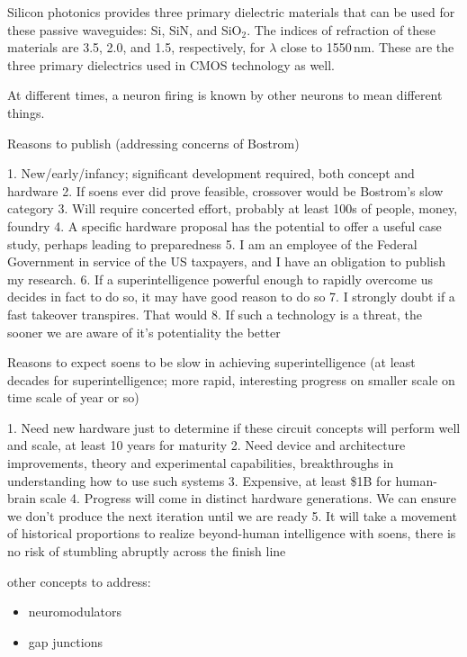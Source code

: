 \documentclass[twocolumn]{article}
\begin{document}
\vspace{2em}
Silicon photonics provides three primary dielectric materials that can be used for these passive waveguides: Si, SiN, and SiO$_2$. The indices of refraction of these materials are 3.5, 2.0, and 1.5, respectively, for $\lambda$ close to 1550\,nm. These are the three primary dielectrics used in CMOS technology as well. 

\vspace{2em}
At different times, a neuron firing is known by other neurons to mean different things.

\vspace{3em}
Reasons to publish (addressing concerns of Bostrom)

1. New/early/infancy; significant development required, both concept and hardware
2. If soens ever did prove feasible, crossover would be Bostrom's slow category
3. Will require concerted effort, probably at least 100s of people, money, foundry
4. A specific hardware proposal has the potential to offer a useful case study, perhaps leading to preparedness
5. I am an employee of the Federal Government in service of the US taxpayers, and I have an obligation to publish my research.
6. If a superintelligence powerful enough to rapidly overcome us decides in fact to do so, it may have good reason to do so
7. I strongly doubt if a fast takeover transpires. That would
8. If such a technology is a threat, the sooner we are aware of it's potentiality the better

Reasons to expect soens to be slow in achieving superintelligence (at least decades for superintelligence; more rapid, interesting progress on smaller scale on time scale of year or so)

1. Need new hardware just to determine if these circuit concepts will perform well and scale, at least 10 years for maturity
2. Need device and architecture improvements, theory and experimental capabilities, breakthroughs in understanding how to use such systems
3. Expensive, at least \$1B for human-brain scale
4. Progress will come in distinct hardware generations. We can ensure we don't produce the next iteration until we are ready
5. It will take a movement of historical proportions to realize beyond-human intelligence with soens, there is no risk of stumbling abruptly across the finish line

\vspace{3em}
other concepts to address:
\begin{itemize}
\item neuromodulators
\item gap junctions
\end{itemize}
\end{document}
